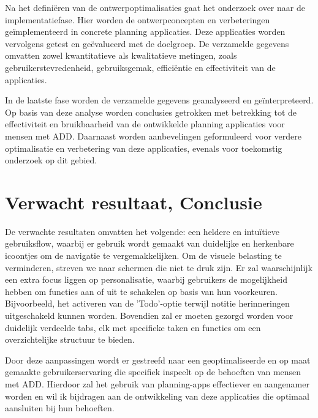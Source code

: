 Na het definiëren van de ontwerpoptimalisaties gaat het onderzoek over naar de implementatiefase. Hier worden de ontwerpconcepten en verbeteringen geïmplementeerd in concrete planning applicaties. Deze applicaties worden vervolgens getest en geëvalueerd met de doelgroep. De verzamelde gegevens omvatten zowel kwantitatieve als kwalitatieve metingen, zoals gebruikerstevredenheid, gebruiksgemak, efficiëntie en effectiviteit van de applicaties. \newline 

In de laatste fase worden de verzamelde gegevens geanalyseerd en geïnterpreteerd. Op basis van deze analyse worden conclusies getrokken met betrekking tot de effectiviteit en bruikbaarheid van de ontwikkelde planning applicaties voor mensen met ADD. Daarnaast worden aanbevelingen geformuleerd voor verdere optimalisatie en verbetering van deze applicaties, evenals voor toekomstig onderzoek op dit gebied.


\section{Verwacht resultaat, Conclusie}%
\label{sec:verwachte_resultaten_conclusie}

De verwachte resultaten omvatten het volgende: een heldere en intuïtieve gebruiksflow, waarbij er gebruik wordt gemaakt van duidelijke en herkenbare icoontjes om de navigatie te vergemakkelijken. Om de visuele belasting te verminderen, streven we naar schermen die niet te druk zijn. \newline
Er zal waarschijnlijk een extra focus liggen op personalisatie, waarbij gebruikers de mogelijkheid hebben om functies aan of uit te schakelen op basis van hun voorkeuren. Bijvoorbeeld, het activeren van de 'Todo'-optie terwijl notitie herinneringen uitgeschakeld kunnen worden. \newline
Bovendien zal er moeten gezorgd worden voor duidelijk verdeelde tabs, elk met specifieke taken en functies om een overzichtelijke structuur te bieden. \newline
 
Door deze aanpassingen wordt er gestreefd naar een geoptimaliseerde en op maat gemaakte gebruikerservaring die specifiek inspeelt op de behoeften van mensen met ADD. Hierdoor zal het gebruik van planning-apps effectiever en aangenamer worden en wil ik bijdragen aan de ontwikkeling van deze applicaties die optimaal aansluiten bij hun behoeften.

